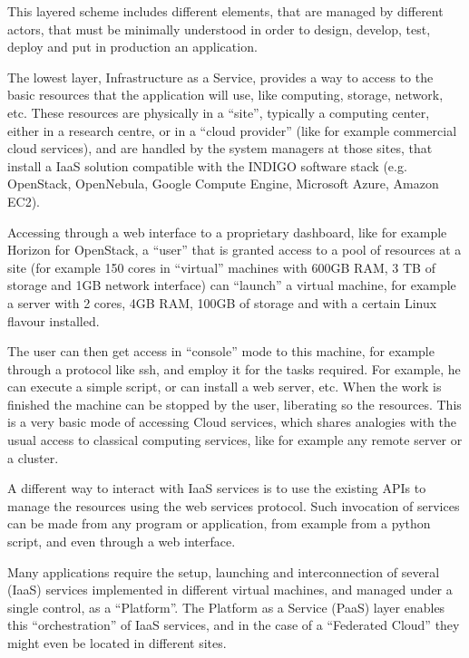 \documentclass{article}
\begin{document}
{This layered scheme includes different elements, that are managed by different actors, that must be minimally understood in order to design, develop, test, deploy and put in production an application.

The lowest layer, Infrastructure as a Service, provides a way to access to the basic resources that the application will use, like computing, storage, network, etc. These resources are physically in a “site”, typically a computing center, either in a research centre, or in a “cloud provider” (like for example commercial cloud services), and are handled by the system managers at those sites, that install a IaaS solution compatible with the INDIGO software stack (e.g. OpenStack, OpenNebula, Google Compute Engine, Microsoft Azure, Amazon EC2). 

Accessing through a web interface to a proprietary dashboard, like for example Horizon for OpenStack, a “user” that is granted access to a pool of resources at a site (for example 150 cores in “virtual” machines with 600GB RAM, 3 TB of storage and 1GB network interface) can “launch” a virtual machine, for example a server with 2 cores, 4GB RAM, 100GB of storage and with a certain Linux flavour installed. 

The user can then get access in “console” mode to this machine, for example through a protocol like ssh, and employ it for the tasks required. For example, he can execute a simple script, or can install a web server, etc. When the work is finished the machine can be stopped by the user, liberating so the resources. This is a very basic mode of accessing Cloud services, which shares analogies with the usual access to classical computing services, like for example any remote server or a cluster.

A different way to interact with IaaS services is to use the existing APIs to manage the resources using the web services protocol. Such invocation of services can be made from any program or application, from example from a python script, and even through a web interface. 

Many applications require the setup, launching and interconnection of several (IaaS) services implemented in different virtual machines, and managed under a single control, as a “Platform”. The Platform as a Service (PaaS) layer enables this “orchestration” of IaaS services, and in the case of a “Federated Cloud” they might even be located in different sites. 


}
\end{document}
